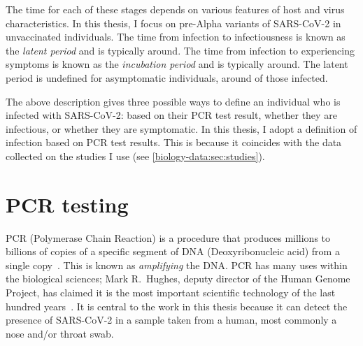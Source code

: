 \documentclass[thesis.tex]{subfiles}
\begin{document}
The time for each of these stages depends on various features of host and virus characteristics.
In this thesis, I focus on pre-Alpha variants of SARS-CoV-2 in unvaccinated individuals.
The time from infection to infectiousness is known as the \emph{latent period} and is typically around.
The time from infection to experiencing symptoms is known as the \emph{incubation period} and is typically around.
The latent period is undefined for asymptomatic individuals, around of those infected.

The above description gives three possible ways to define an individual who is infected with SARS-CoV-2: based on their PCR test result, whether they are infectious, or whether they are symptomatic.
In this thesis, I adopt a definition of infection based on PCR test results.
This is because it coincides with the data collected on the studies I use (see \cref{biology-data:sec:studies}).



\section{PCR testing} \label{biology-data:sec:PCR}


PCR (Polymerase Chain Reaction) is a procedure that produces millions to billions of copies of a specific segment of DNA (Deoxyribonucleic acid) from a single copy~\autocite{smithPCR,garibyanPCR}.
This is known as \emph{amplifying} the DNA.
PCR has many uses within the biological sciences; Mark R.\ Hughes, deputy director of the Human Genome Project, has claimed it is the most important scientific technology of the last hundred years~\autocite{powledgePCR}.
It is central to the work in this thesis because it can detect the presence of SARS-CoV-2 in a sample taken from a human, most commonly a nose and/or throat swab.
\end{document}
